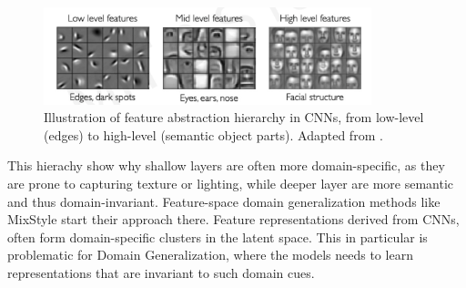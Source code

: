 \begin{figure}[ht]
    \centering
    \includegraphics[width=0.85\textwidth]{images/Learning-Feature-Representation.png}
    \caption{Illustration of feature abstraction hierarchy in CNNs, from low-level (edges) to high-level (semantic object parts). Adapted from \cite{alexanderaminiMITIntroductionDeep2025}.}
    \label{fig:Hierachy_of_Features}
\end{figure}
This hierachy show why shallow layers are often more domain-specific, as they are prone to capturing texture or lighting, while deeper layer are more semantic and thus domain-invariant. Feature-space domain generalization methods like MixStyle \cite{zhouMixStyleNeuralNetworks2023} start their approach there.
Feature representations derived from CNNs, often form domain-specific clusters in the latent space. This in particular is problematic for Domain Generalization, where the models needs to learn representations that are invariant to such domain cues. \cite{zhouDomainGeneralizationSurvey2022}

